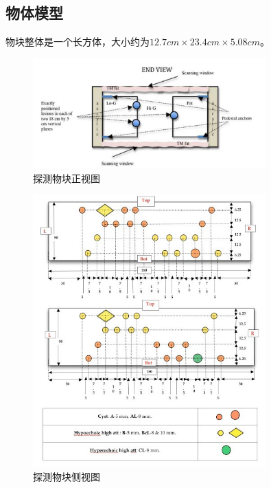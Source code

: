 \subsection{物体模型}
物块整体是一个长方体，大小约为$12.7cm\times23.4cm\times5.08cm$。
\begin{figure}[h!]
\center
\includegraphics[width=0.8\textwidth]{figure/object/front}
\caption{探测物块正视图}\label{fig:objfront}
\end{figure}
\begin{figure}[h!]
\center
\includegraphics[width=0.8\textwidth]{figure/object/side}
\caption{探测物块侧视图}\label{fig:objside}
\end{figure}
